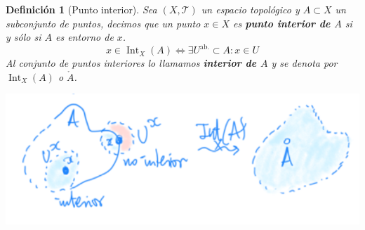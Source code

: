 \documentclass[10pt,a4paper,openright]{book}
\theoremstyle{break}
\newtheorem*{defi}{Definición}
\DeclareMathOperator{\inter}{Int}
\begin{document}
\begin{defi}[Punto interior]
Sea $(X,\mathcal{T})$ un espacio topológico y $A \subset X$ un subconjunto de puntos, decimos que un punto $x\in X$ es \textbf{punto interior de $A$} si y sólo si $A$ es entorno de $x$.
$$
x\in \inter_X(A) \Leftrightarrow \exists U^{\text{ab.}} \subset A : x \in U
$$
Al conjunto de puntos interiores lo llamamos \textbf{interior de $A$} y se denota por $\inter_X \left( A \right)$ o $\mathring{A}$.
\end{defi}
\begin{center}
    \includegraphics[scale=0.4]{images/def_interior} 
\end{center}
\end{document}
